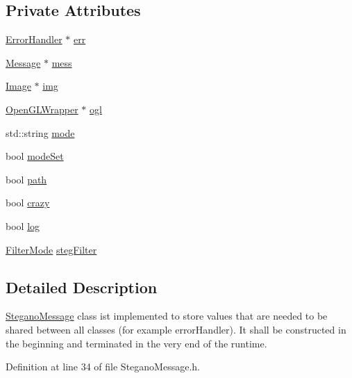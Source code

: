\subsection*{Private Attributes}
\begin{DoxyCompactItemize}
\item 
\mbox{\hyperlink{classErrorHandler}{Error\+Handler}} $\ast$ \mbox{\hyperlink{classSteganoMessage_a26b631e00716be7a89cbcf22cf0b7291}{err}}
\item 
\mbox{\hyperlink{classMessage}{Message}} $\ast$ \mbox{\hyperlink{classSteganoMessage_a64f70bbacb0662cebe764316658da35d}{mess}}
\item 
\mbox{\hyperlink{classImage}{Image}} $\ast$ \mbox{\hyperlink{classSteganoMessage_acd7dba217d5df515d93ddf814734ecf4}{img}}
\item 
\mbox{\hyperlink{classOpenGLWrapper}{Open\+G\+L\+Wrapper}} $\ast$ \mbox{\hyperlink{classSteganoMessage_aa64b05c1ea93d5403571f25f0902e2e3}{ogl}}
\item 
std\+::string \mbox{\hyperlink{classSteganoMessage_a8772194b7823da730648f8d4c06334a8}{mode}}
\item 
bool \mbox{\hyperlink{classSteganoMessage_ae1da17c621a8db71fa4eb3b148a82ceb}{mode\+Set}}
\item 
bool \mbox{\hyperlink{classSteganoMessage_a399f4c181d3b7b15ccdb5c925a7a1f51}{path}}
\item 
bool \mbox{\hyperlink{classSteganoMessage_aa66c9e1d0367981d42ede819e1a51131}{crazy}}
\item 
bool \mbox{\hyperlink{classSteganoMessage_a687c455d3f09eb5349e0358cb07aa21c}{log}}
\item 
\mbox{\hyperlink{constants_8h_a36bd51b89b9e0e6e4dbbe565b9155083}{Filter\+Mode}} \mbox{\hyperlink{classSteganoMessage_af20fb772ae34deaccd23144b38f06320}{steg\+Filter}}
\end{DoxyCompactItemize}


\subsection{Detailed Description}
\mbox{\hyperlink{classSteganoMessage}{Stegano\+Message}} class ist implemented to store values that are needed to be shared between all classes (for example error\+Handler). It shall be constructed in the beginning and terminated in the very end of the runtime. 

Definition at line 34 of file Stegano\+Message.\+h.



